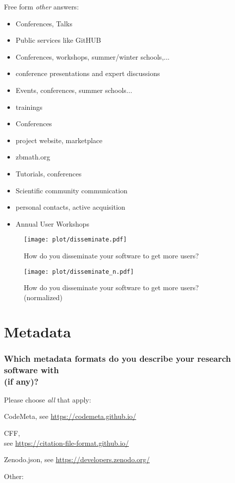 \documentclass[headsepline,titlepage,twoside,12pt,toc=flat,headings=normal]{scrreprt}
\newcommand{\question}[1]{\subsubsection{#1}}
\newcommand{\otherbox}{\fbox{\phantom{This is how big an answer would be.}}}
\begin{document}
Free form \emph{other} answers:
\begin{itemize}
\item Conferences, Talks
\item Public services like GitHUB
\item Conferences, workshops, summer/winter schools,...
\item conference presentations and expert discussions
\item Events, conferences, summer schools...
\item trainings
\item Conferences
\item project website, marketplace
\item zbmath.org
\item Tutorials, conferences
\item Scientific community communication
\item personal contacts, active acquisition
\item Annual User Workshops
\end{itemize}

\begin{figure}[h!]
\caption{How do you disseminate your software to get more users?}
\label{fig:disseminate}
\texttt{[image: plot/disseminate.pdf]}
\end{figure}

\begin{figure}[h!]
\caption{How do you disseminate your software to get more users? (normalized)}
\label{fig:disseminate_n}
\texttt{[image: plot/disseminate\_n.pdf]}
\end{figure}

\clearpage
\section{Metadata}
\question{Which metadata formats do you describe your research software with\\(if any)?}\label{which-metadata-formats-do-you-describe-your-research-software-with-if-any}
Please choose \emph{all} that apply:

\begin{answers}
\item CodeMeta, see \url{https://codemeta.github.io/}
\item \acf{CFF},\\see \url{https://citation-file-format.github.io/}
\item Zenodo.json, see \url{https://developers.zenodo.org/}
\item Other: \otherbox
\end{answers}
\end{document}
